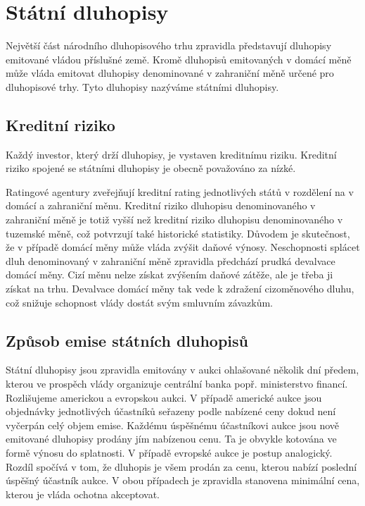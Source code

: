 \documentclass[a4paper]{book}
\begin{document}
\section{Státní dluhopisy}

Největší část národního dluhopisového trhu zpravidla představují dluhopisy emitované vládou příslušné země. Kromě dluhopisů emitovaných v domácí měně může vláda emitovat dluhopisy denominované v zahraniční měně určené pro dluhopisové trhy. Tyto dluhopisy nazýváme státními dluhopisy.

\subsection{Kreditní riziko}

Každý investor, který drží dluhopisy, je vystaven kreditnímu riziku. Kreditní riziko spojené se státními dluhopisy je obecně považováno za nízké.

Ratingové agentury zveřejňují kreditní rating jednotlivých států v rozdělení na v domácí a zahraniční měnu. Kreditní riziko dluhopisu denominovaného v zahraniční měně je totiž vyšší než kreditní riziko dluhopisu denominovaného v tuzemské měně, což potvrzují také historické statistiky. Důvodem je skutečnost, že v případě domácí měny může vláda zvýšit daňové výnosy. Neschopnosti splácet dluh denominovaný v zahraniční měně zpravidla předchází prudká devalvace domácí měny. Cizí měnu nelze získat zvýšením daňové zátěže, ale je třeba ji získat na trhu. Devalvace domácí měny tak vede k zdražení cizoměnového dluhu, což snižuje schopnost vlády dostát svým smluvním závazkům.

\subsection{Způsob emise státních dluhopisů}

Státní dluhopisy jsou zpravidla emitovány v aukci ohlašované několik dní předem, kterou ve prospěch vlády organizuje centrální banka popř. ministerstvo financí. Rozlišujeme americkou a evropskou aukci. V případě americké aukce jsou objednávky jednotlivých účastníků seřazeny podle nabízené ceny dokud není vyčerpán celý objem emise. Každému úspěšnému účastníkovi aukce jsou nově emitované dluhopisy prodány jím nabízenou cenu. Ta je obvykle kotována ve formě výnosu do splatnosti. V případě evropské aukce je postup analogický. Rozdíl spočívá v tom, že dluhopis je všem prodán za cenu, kterou nabízí poslední úspěšný účastník aukce. V obou případech je zpravidla stanovena minimální cena, kterou je vláda ochotna akceptovat.
\end{document}
